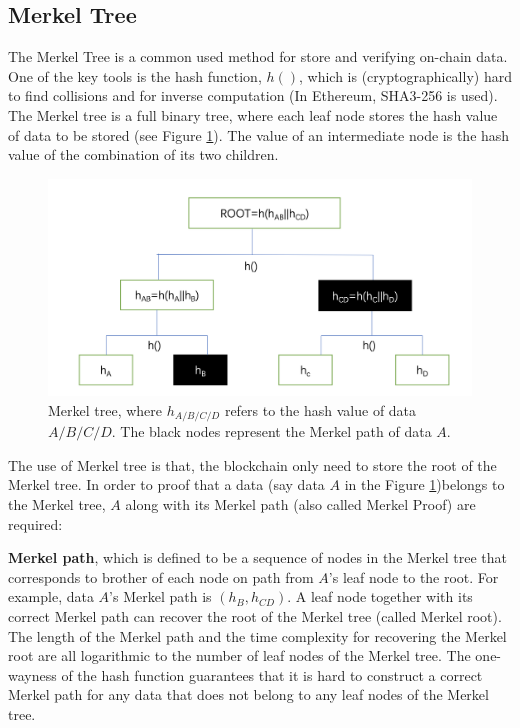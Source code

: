 \subsection{Merkel Tree}
The Merkel Tree is a common used method for store and verifying on-chain data. One of the key tools is the hash function, $h()$, which is (cryptographically) hard to find collisions and for inverse computation (In Ethereum, SHA3-256 is used). The Merkel tree is a full binary tree, where each leaf node stores the hash value of data to be stored (see Figure \ref{fig:merkel}). The value of an intermediate node is the hash value of the combination of its two children. 
\begin{figure}
	\centering
	\label{fig:merkel}
	\includegraphics[width=1.1\textwidth]{merkel.png}
	\caption{Merkel tree, where $h_{A/B/C/D}$ refers to the hash value of data $A/B/C/D$. The black nodes represent the Merkel path of data $A$.}
\end{figure}

The use of Merkel tree is that, the blockchain only need to store the root of the Merkel tree. In order to proof that a data (say data $A$ in the Figure \ref{fig:merkel})belongs to the Merkel tree, $A$ along with its Merkel path (also called Merkel Proof) are required:

\textbf{Merkel path}, which is defined to be a sequence of nodes in the Merkel tree that corresponds to brother of each node on path from  $A$'s leaf node to the root. For example, data $A$'s Merkel path is $(h_B,h_{CD})$. A leaf node together with its correct Merkel path can recover the root of the Merkel tree (called Merkel root). The length of the Merkel path and the time complexity for recovering the Merkel root are all logarithmic to the number of leaf nodes of the Merkel tree. The one-wayness of the hash function guarantees that it is hard to construct a correct Merkel path for any data that does not belong to any leaf nodes of the Merkel tree.
